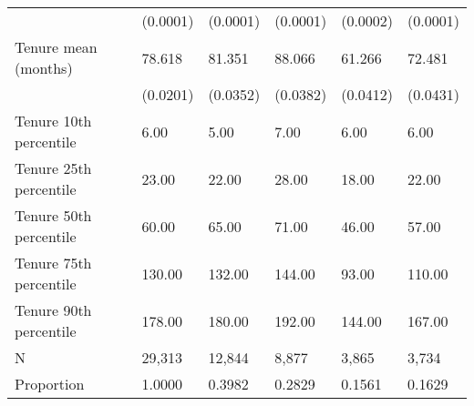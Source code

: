 \begin{tabular}{llllll}
                             &  (0.0001) &  (0.0001) &  (0.0001) &           (0.0002) &         (0.0001) \\
Tenure mean (months)         &    78.618 &    81.351 &    88.066 &             61.266 &           72.481 \\
                             &  (0.0201) &  (0.0352) &  (0.0382) &           (0.0412) &         (0.0431) \\
Tenure 10th percentile       &      6.00 &      5.00 &      7.00 &               6.00 &             6.00 \\
Tenure 25th percentile       &     23.00 &     22.00 &     28.00 &              18.00 &            22.00 \\
Tenure 50th percentile       &     60.00 &     65.00 &     71.00 &              46.00 &            57.00 \\
Tenure 75th percentile       &    130.00 &    132.00 &    144.00 &              93.00 &           110.00 \\
Tenure 90th percentile       &    178.00 &    180.00 &    192.00 &             144.00 &           167.00 \\
N                            &    29,313 &    12,844 &     8,877 &              3,865 &            3,734 \\
Proportion                   &    1.0000 &    0.3982 &    0.2829 &             0.1561 &           0.1629 \\
\bottomrule
\end{tabular}
